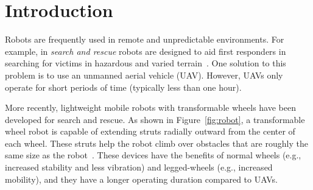 \vspace{-0.25in}

\section{Introduction}

Robots are frequently used in remote and unpredictable environments.
%
%
For example, in \emph{search and rescue} robots are designed to aid first responders in searching for victims in hazardous and varied terrain~\citep{Graf.2017.2ISSCIS.RescuePathOptimization}.
%
One solution to this problem is to use an unmanned aerial vehicle (UAV). However, UAVs only operate for short periods of time (typically less than one hour).

More recently, lightweight mobile robots with transformable wheels have been developed for search and rescue.
%
As shown in Figure~\ref{fig:robot}, a transformable wheel robot is capable of extending struts radially outward from the center of each wheel. These struts help the robot climb over obstacles that are roughly the same size as the robot~\citep{Clark.2018.C.EvolvingControllersTransformable}.
%
These devices have the benefits of normal wheels (e.g., increased stability and less vibration) and legged-wheels (e.g., increased mobility), and they have a longer operating duration compared to UAVs.


